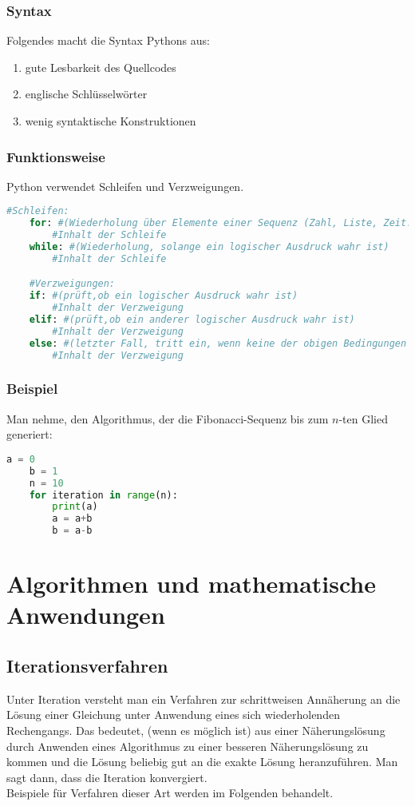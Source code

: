 \subsubsection{Syntax}
Folgendes macht die Syntax Pythons aus:\\
\begin{enumerate}
\item gute Lesbarkeit des Quellcodes
\item englische Schlüsselwörter
\item wenig syntaktische Konstruktionen
\end{enumerate}

\subsubsection{Funktionsweise}
Python verwendet Schleifen und Verzweigungen.\\
\begin{lstlisting}[language=Python]
	#Schleifen:
	for: #(Wiederholung über Elemente einer Sequenz (Zahl, Liste, Zeit...))
		#Inhalt der Schleife
	while: #(Wiederholung, solange ein logischer Ausdruck wahr ist)
		#Inhalt der Schleife

	#Verzweigungen:
	if: #(prüft,ob ein logischer Ausdruck wahr ist)
		#Inhalt der Verzweigung
	elif: #(prüft,ob ein anderer logischer Ausdruck wahr ist)
		#Inhalt der Verzweigung
	else: #(letzter Fall, tritt ein, wenn keine der obigen Bedingungen erfüllt wurde)
		#Inhalt der Verzweigung
\end{lstlisting}
\subsubsection{Beispiel}
Man nehme, den Algorithmus, der die Fibonacci-Sequenz bis zum $n$-ten Glied generiert:\\
\begin{lstlisting}[language=Python]
	a = 0
	b = 1
	n = 10
	for iteration in range(n):
		print(a)
		a = a+b
		b = a-b
\end{lstlisting}
\section{Algorithmen und mathematische Anwendungen}
\subsection{Iterationsverfahren}
Unter Iteration versteht man ein Verfahren zur schrittweisen Annäherung an die Lösung einer Gleichung unter Anwendung eines sich wiederholenden Rechengangs. Das bedeutet, (wenn es möglich ist) aus einer Näherungslösung durch Anwenden eines Algorithmus zu einer besseren Näherungslösung zu kommen und die Lösung beliebig gut an die exakte Lösung heranzuführen. Man sagt dann, dass die Iteration konvergiert.\\
Beispiele für Verfahren dieser Art werden im Folgenden behandelt.
